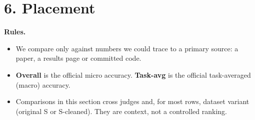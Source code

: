 \documentclass[11pt]{article}
\providecommand{\tightlist}{\setlength{\itemsep}{0pt}\setlength{\parskip}{0pt}}
\begin{document}
\hypertarget{placement}{%
\section{6. Placement}\label{placement}}

\textbf{Rules.}

\begin{itemize}
\tightlist
\item
  We compare only against numbers we could trace to a primary source: a paper, a results page or committed
  code.
\item
  \textbf{Overall} is the official micro accuracy. \textbf{Task-avg} is the official task-averaged (macro) accuracy.
\item
  Comparisons in this section cross judges and, for most rows, dataset variant (original S or S-cleaned).
  They are context, not a controlled ranking.
\end{itemize}
\end{document}
